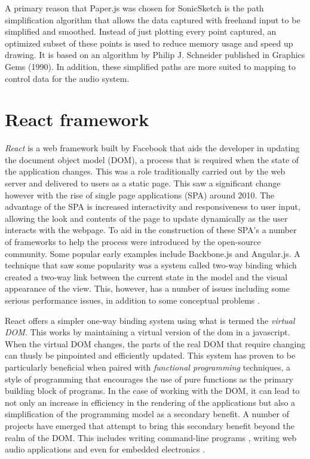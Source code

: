 \documentclass[12pt]{report}
\begin{document}
A primary reason that Paper.js was chosen for SonicSketch is the path
simplification algorithm that allows the data captured with freehand input to be
simplified and smoothed. Instead of just plotting every point captured, an
optimized subset of these points is used to reduce memory usage and speed up
drawing. It is based on an algorithm by Philip J. Schneider published in
Graphics Gems (1990). In addition, these simplified paths are more suited to
mapping to control data for the audio system.

\section{React framework}
\label{sec:org3290054}
\emph{React} is a web framework built by Facebook that aids the developer in updating
the document object model (DOM), a process that is required when the state of
the application changes. This was a role traditionally carried out by the web
server and delivered to users as a static page. This saw a significant change
however with the rise of single page applications (SPA) around 2010. The
advantage of the SPA is increased interactivity and responsiveness to user
input, allowing the look and contents of the page to update dynamically as the
user interacts with the webpage. To aid in the construction of these SPA's a
number of frameworks to help the process were introduced by the open-source
community. Some popular early examples include Backbone.js and Angular.js. A
technique that saw some popularity was a system called two-way binding which
created a two-way link between the current state in the model and the visual
appearance of the view. This, however, has a number of issues including some
serious performance issues, in addition to some conceptual problems
\cite{whelpley_is_2014}.

React offers a simpler one-way binding system using what is termed the \emph{virtual
DOM}. This works by maintaining a virtual version of the dom in a javascript.
When the virtual DOM changes, the parts of the real DOM that require changing
can thusly be pinpointed and efficiently updated. This system has proven to be
particularly beneficial when paired with \emph{functional programming} techniques, a
style of programming that encourages the use of pure functions as the primary
building block of programs. In the case of working with the DOM, it can lead to
not only an increase in efficiency in the rendering of the applications but also
a simplification of the programming model as a secondary benefit. A number of
projects have emerged that attempt to bring this secondary benefit beyond the
realm of the DOM. This includes writing command-line programs
\cite{demedes_vadimdemedes/ink:_2017}, writing web audio applications
\cite{formidablelabs_react-music:_2017} and even for embedded electronics
\cite{kasten_react-hardware:_2017}.
\end{document}
